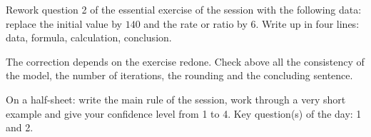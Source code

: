 
    \begin{homework}Rework question 2 of the essential exercise of the session with the following data: replace the initial value by $140$ and the rate or ratio by $6$. Write up in four lines: data, formula, calculation, conclusion.\end{homework}
    \begin{solution}The correction depends on the exercise redone. Check above all the consistency of the model, the number of iterations, the rounding and the concluding sentence.\end{solution}

    \begin{exitticket}[3 minutes]On a half-sheet: write the main rule of the session, work through a very short example and give your confidence level from 1 to 4. Key question(s) of the day: 1 and 2.\end{exitticket}

